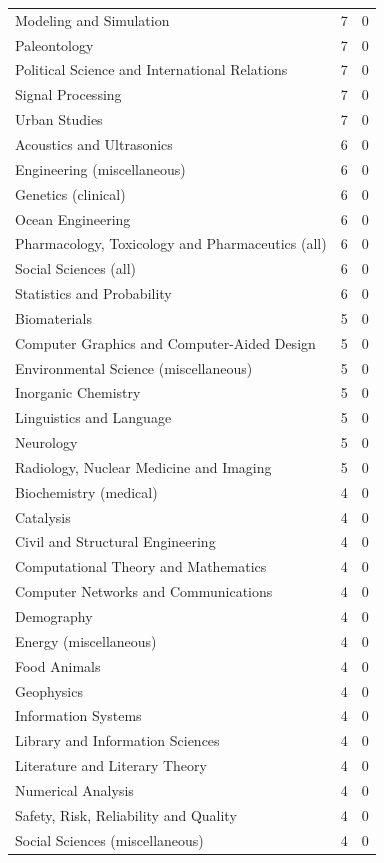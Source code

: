 \documentclass[12pt,brazil]{article}\usepackage[]{graphicx}\usepackage[]{xcolor}
\begin{document}
\begin{longtable}{lrr}
Modeling and Simulation & 7 & 0 \\
Paleontology & 7 & 0 \\
Political Science and International Relations & 7 & 0 \\
Signal Processing & 7 & 0 \\
Urban Studies & 7 & 0 \\
Acoustics and Ultrasonics & 6 & 0 \\
Engineering (miscellaneous) & 6 & 0 \\
Genetics (clinical) & 6 & 0 \\
Ocean Engineering & 6 & 0 \\
Pharmacology, Toxicology and Pharmaceutics (all) & 6 & 0 \\
Social Sciences (all) & 6 & 0 \\
Statistics and Probability & 6 & 0 \\
Biomaterials & 5 & 0 \\
Computer Graphics and Computer-Aided Design & 5 & 0 \\
Environmental Science (miscellaneous) & 5 & 0 \\
Inorganic Chemistry & 5 & 0 \\
Linguistics and Language & 5 & 0 \\
Neurology & 5 & 0 \\
Radiology, Nuclear Medicine and Imaging & 5 & 0 \\
Biochemistry (medical) & 4 & 0 \\
Catalysis & 4 & 0 \\
Civil and Structural Engineering & 4 & 0 \\
Computational Theory and Mathematics & 4 & 0 \\
Computer Networks and Communications & 4 & 0 \\
Demography & 4 & 0 \\
Energy (miscellaneous) & 4 & 0 \\
Food Animals & 4 & 0 \\
Geophysics & 4 & 0 \\
Information Systems & 4 & 0 \\
Library and Information Sciences & 4 & 0 \\
Literature and Literary Theory & 4 & 0 \\
Numerical Analysis & 4 & 0 \\
Safety, Risk, Reliability and Quality & 4 & 0 \\
Social Sciences (miscellaneous) & 4 & 0 \\

\end{longtable}
\end{document}
